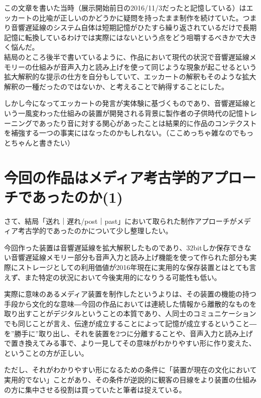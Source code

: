 \documentclass[a4paper,report]{jsbook}
\begin{document}
この文章を書いた当時（展示開始前日の2016/11/3だったと記憶している）はエッカートの比喩が正しいのかどうかに疑問を持ったまま制作を続けていた。つまり音響遅延線のシステム自体は短期記憶がひたすら繰り返されているだけで長期記憶に転換しているわけでは実際にはないという点をどう咀嚼するべきかで大きく悩んだ。\\
結局のところ後半で書いているように、作品において現代の状況で音響遅延線メモリーの仕組みが音声入力と読み上げを使って同じような現象が起こせるという拡大解釈的な提示の仕方を自分もしていて、エッカートの解釈もそのような拡大解釈の一種だったのではないか、と考えることで納得することにした。

しかし今になってエッカートの発言が実体験に基づくものであり、音響遅延線という一風変わった仕組みの装置が開発される背景に製作者の子供時代の記憶トレーニングであったり音に対する関心があったことは結果的に作品のコンテクストを補強する一つの事実にはなったのかもしれない。（ここめっちゃ雑なのでもっとちゃんと書きたい）

\section{今回の作品はメディア考古学的アプローチであったのか(1)}\label{ux4ecaux56deux306eux4f5cux54c1ux306fux30e1ux30c7ux30a3ux30a2ux8003ux53e4ux5b66ux7684ux30a2ux30d7ux30edux30fcux30c1ux3067ux3042ux3063ux305fux306eux304b1}

さて、結局「送れ｜遅れ/post｜past」において取られた制作アプローチがメディア考古学的であったのかについて少し整理したい。

今回作った装置は音響遅延線を拡大解釈したものであり、32bitしか保存できない音響遅延線メモリー部分も音声入力と読み上げ機能を使って作られた部分も実際にストレージとしての利用価値が2016年現在に実用的な保存装置とはとても言えず、また特定の状況において今後実用的になりうる可能性も低い。

実際に意味のあるメディア装置を制作したというよりは、その装置の機能の持つ手段から文化的な意味―今回の作品においては連続した情報から離散的なものを取り出すことがデジタルということの本質であり、人同士のコミュニケーションでも同じことが言え、伝達が成立することによって記憶が成立するということ―を''勝手に''取り出し、それを装置を2つに分離することや、音声入力と読み上げで置き換えてみる事で、より一見してその意味がわかりやすい形に作り変えた、ということの方が正しい。

ただし、それがわかりやすい形になるための条件に「装置が現在の文化において実用的でない」ことがあり、その条件が逆説的に観客の目線をより装置の仕組みの方に集中させる役割は買っていたと筆者は捉えている。
\end{document}
